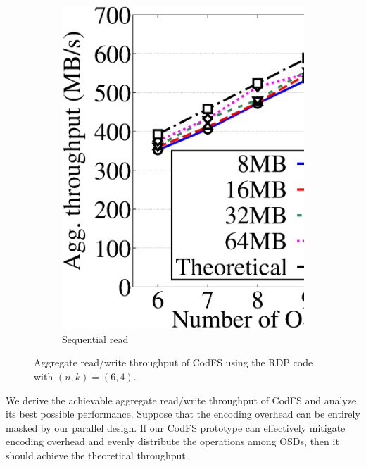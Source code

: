 \begin{figure}[!t]
\begin{subfigure}{0.48\linewidth}
     \includegraphics[width=\linewidth]{charts/transfer/eps/down/rdp_6}
     \caption{Sequential read}
     \label{fig:rdp_read}
 \end{subfigure}
 \hspace{0.005\linewidth}
 \setlength{}
 \setlength{}
 \caption{Aggregate read/write throughput of CodFS using the RDP code with
	 $(n,k)=(6,4)$.}
 \setlength\abovecaptionskip{10pt}
 \setlength\belowcaptionskip{0pt}
 \label{fig:data}
\end{figure}


We derive the achievable aggregate read/write throughput of CodFS and analyze
its best possible performance.  Suppose that the encoding overhead can be
entirely masked by our parallel design.  If our CodFS prototype can
effectively mitigate encoding overhead and evenly distribute the operations
among OSDs, then it should achieve the theoretical throughput. 

